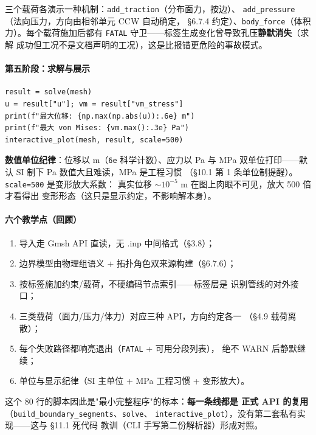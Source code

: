 \documentclass[12pt,a4paper]{ctexart}
\newcommand{\fem}{\Verb}
\begin{document}
三个载荷各演示一种机制：\fem|add_traction|（分布面力，按边）、
\fem|add_pressure|（法向压力，方向由相邻单元 CCW 自动确定，
§6.7.4 约定）、\fem|body_force|（体积力）。每个载荷施加后都有
\fem|FATAL| 守卫——标签生成变化曾导致孔压\textbf{静默消失}（求解
成功但工况不是文档声明的工况），这是比报错更危险的事故模式。

\paragraph{第五阶段：求解与展示}

\begin{lstlisting}
result = solve(mesh)
u = result["u"]; vm = result["vm_stress"]
print(f"最大位移: {np.max(np.abs(u)):.6e} m")
print(f"最大 von Mises: {vm.max():.3e} Pa")
interactive_plot(mesh, result, scale=500)
\end{lstlisting}

\textbf{数值单位纪律}：位移以 m（\fem|6e| 科学计数）、应力以 Pa 与
MPa 双单位打印——默认 SI 制下 Pa 数值大且难读，MPa 是工程习惯
（§10.1 第 1 条单位制提醒）。\fem|scale=500| 是变形放大系数：
真实位移 $\sim 10^{-5}$ m 在图上肉眼不可见，放大 500 倍才看得出
变形形态（这只是显示约定，不影响解本身）。

\paragraph{六个教学点（回顾）}

\begin{enumerate}[leftmargin=*]
  \item 导入走 Gmsh API 直读，无 .inp 中间格式（§3.8）；
  \item 边界模型由物理组语义 + 拓扑角色双来源构建（§6.7.6）；
  \item 按标签施加约束/载荷，不硬编码节点索引——标签层是
        识别管线的对外接口；
  \item 三类载荷（面力/压力/体力）对应三种 API，方向约定各一
        （§4.9 载荷离散）；
  \item 每个失败路径都响亮退出（\fem|FATAL| + 可用分段列表），
        绝不 WARN 后静默继续；
  \item 单位与显示纪律（SI 主单位 + MPa 工程习惯 + 变形放大）。
\end{enumerate}

这个 80 行的脚本因此是"最小完整程序"的标本：\textbf{每一条线都是
正式 API 的复用}（\fem|build_boundary_segments|、\fem|solve|、
\fem|interactive_plot|），没有第二套私有实现——这与 §11.1 死代码
教训（CLI 手写第二份解析器）形成对照。
\end{document}
